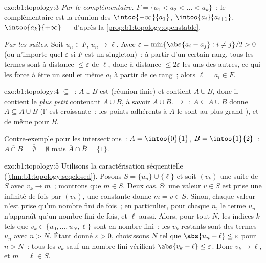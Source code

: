 \begin{solution}{exo:b1:topology:3}
\emph{Par le complémentaire.} $F = \{a_1 < a_2 < \dots < a_k\}$~: le
complémentaire est la réunion des  
$\intoo{-\infty}{a_1}$, $\intoo{a_i}{a_{i+1}}$, $\intoo{a_k}{+\infty}$
---  d'après la \cref{prop:b1:topology:openstable}.

\emph{Par les suites.} Soit $u_n \in F$, $u_n \to \ell$. Avec
$\varepsilon = \min\{\abs{a_i - a_j} : i \neq j\}/2 > 0$ (ou
n'importe quel $\varepsilon$ si $F$ est un singleton)~: à partir d'un
certain rang, tous les termes sont à distance $\leq \varepsilon$ de
$\ell$, donc à distance $\leq 2\varepsilon$ les uns des autres, ce qui
les force à être un seul et même $a_i$ à partir de ce rang~; alors
$\ell = a_i \in F$.
\end{solution}

\begin{solution}{exo:b1:topology:4}
$\subseteq$~: $\overline A \cup \overline B$ est  (réunion finie)
et contient $A \cup B$, donc il contient le \emph{plus petit} 
contenant $A \cup B$, à savoir $\overline{A \cup B}$. $\supseteq$~:
$A \subseteq A \cup B$ donne $\overline A \subseteq \overline{A \cup B}$
(l' est croissante~: les points adhérents à $A$ le sont au
plus grand ), et de même pour $B$.

Contre-exemple pour les intersections~: $A = \intoo{0}{1}$, $B =
\intoo{1}{2}$~: $\overline{A \cap B} = \overline\emptyset = \emptyset$
mais $\overline A \cap \overline B = \{1\}$.
\end{solution}

\begin{solution}{exo:b1:topology:5}
Utilisons la caractérisation séquentielle
(\cref{thm:b1:topology:seqclosed}). Posons $S = \{u_n\} \cup \{\ell\}$
et soit $(v_k)$ une suite de $S$ avec $v_k \to m$~; montrons que
$m \in S$. Deux cas. Si une valeur $v \in S$ est prise une infinité de
fois par $(v_k)$, une  constante donne $m = v \in S$.
Sinon, chaque valeur n'est prise qu'un nombre fini de fois~; en
particulier, pour chaque $n$, le terme $u_n$ n'apparaît qu'un nombre
fini de fois, et $\ell$ aussi. Alors, pour tout $N$, les indices $k$
tels que $v_k \in \{u_0, \dots, u_N, \ell\}$ sont en nombre fini~: les
$v_k$ restants sont des termes $u_n$ avec $n > N$. Étant donné
$\varepsilon > 0$, choisissons $N$ tel que $\abs{u_n - \ell} \leq
\varepsilon$ pour $n > N$~: tous les $v_k$ sauf un nombre fini
vérifient $\abs{v_k - \ell} \leq \varepsilon$. Donc $v_k \to \ell$, et
$m = \ell \in S$.
\end{solution}

